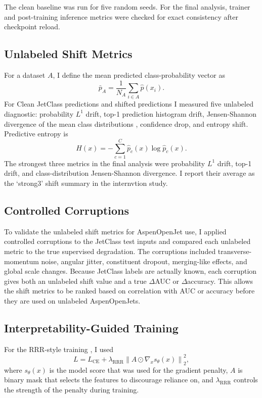 \documentclass[11pt]{article}
\begin{document}
The clean baseline was run for five random seeds. For the final analysis, trainer and post-training inference metrics were checked for exact consistency after checkpoint reload.


\subsection{Unlabeled Shift Metrics}

For a dataset $A$, I define the mean predicted class-probability vector as 
\begin{equation}
\bar{p}_{A} = \frac{1}{N_A}\sum_{i\in A}\hat{p}(x_i).
\end{equation}
For Clean JetClass predictions and shifted predictions I measured five unlabeled diagnostic: probability $L^1$ drift, top-1 prediction histogram drift, Jensen-Shannon divergence of the mean class distributions \cite{lin1991divergence}, confidence drop, and entropy shift.  Predictive entropy is
\begin{equation}
H(x) = -\sum_{c=1}^{C}\hat{p}_c(x)\log \hat{p}_c(x).
\end{equation}
The strongest three metrics in the final analysis were probability $L^1$ drift, top-1 drift, and class-distribution Jensen-Shannon divergence. I report their average as the ‘strong3’ shift summary in the internvtion study.


\subsection{Controlled Corruptions}

To validate the unlabeled shift metrics for AspenOpenJet use, I applied controlled corruptions to the JetClass test inputs and compared each unlabeled metric to the true supervised degradation. The corruptions included transverse-momentum noise, angular jitter, constituent dropout, merging-like effects, and global scale changes. Because JetClass labels are actually known, each corruption gives both an unlabeled shift value and a true $\Delta$AUC or $\Delta$accuracy. This allows the shift metrics to be ranked based on correlation with AUC or accuracy before they are used on unlabeled AspenOpenJets.

\subsection{Interpretability-Guided Training}

For the RRR-style training \cite{ross2017right}, I used
\begin{equation}
L = L_{\mathrm{CE}} + \lambda_{\mathrm{RRR}}\left\|A\odot\nabla_x s_\theta(x)\right\|_2^2,
\end{equation}
where $s_\theta(x)$ is the model score that was used for the gradient penalty, $A$ is binary mask that selects the features to discourage reliance on, and $\lambda_{\mathrm{RRR}}$ controls the strength of the penalty during training.
\end{document}
